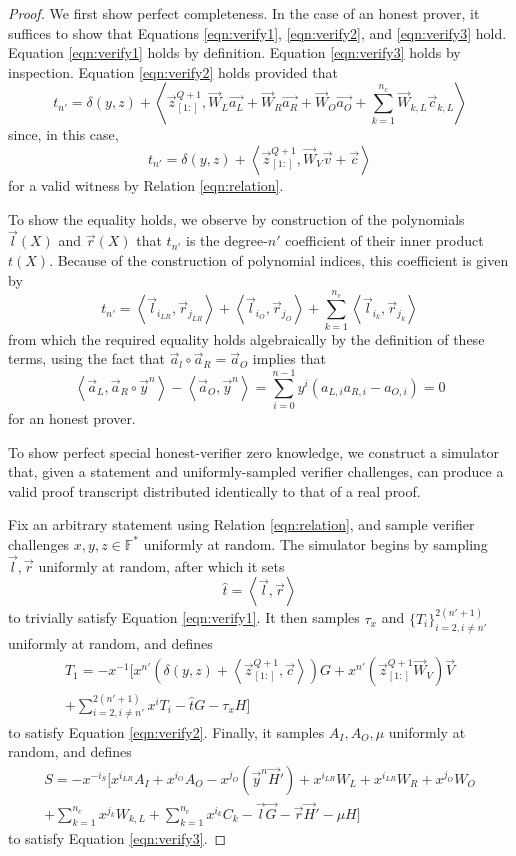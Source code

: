 \documentclass{article}
\newcommand{\FF}{\mathbb{F}}
\newcommand{\mat}[1]{\vec{#1}}
\newcommand{\zq}{\vec{z}^{Q+1}_{[1:]}}
\begin{document}
\begin{proof}
	We first show perfect completeness.
	In the case of an honest prover, it suffices to show that Equations \ref{eqn:verify1}, \ref{eqn:verify2}, and \ref{eqn:verify3} hold.
	Equation \ref{eqn:verify1} holds by definition.
	Equation \ref{eqn:verify3} holds by inspection.
	Equation \ref{eqn:verify2} holds provided that
	$$t_{n'} = \delta(y, z) + \left\langle \zq, \mat{W}_L \vec{a_L} + \mat{W}_R \vec{a_R} + \mat{W}_O \vec{a_O} + \sum_{k=1}^{n_c} \mat{W}_{k,L} \vec{c}_{k,L} \right\rangle$$
	since, in this case,
	$$t_{n'} = \delta(y, z) + \left\langle \zq, \mat{W}_V \vec{v} + \vec{c} \right\rangle$$
	for a valid witness by Relation \ref{eqn:relation}.

	To show the equality holds, we observe by construction of the polynomials $\vec{l}(X)$ and $\vec{r}(X)$ that $t_{n'}$ is the degree-$n'$ coefficient of their inner product $t(X)$.
	Because of the construction of polynomial indices, this coefficient is given by
	$$t_{n'} = \left\langle \vec{l}_{i_{LR}}, \vec{r}_{j_{LR}} \right\rangle
	+ \left\langle \vec{l}_{i_O}, \vec{r}_{j_O} \right\rangle
	+ \sum_{k=1}^{n_c} \left\langle \vec{l}_{i_k}, \vec{r}_{j_k} \right\rangle$$
	from which the required equality holds algebraically by the definition of these terms, using the fact that $\vec{a}_l \circ \vec{a}_R = \vec{a}_O$ implies that
	$$\left\langle \vec{a}_L, \vec{a}_R \circ \vec{y}^n \right\rangle - \left\langle \vec{a}_O, \vec{y}^n \right\rangle = \sum_{i=0}^{n-1} y^i \left( a_{L,i} a_{R,i} - a_{O,i} \right) = 0$$
	for an honest prover.

	To show perfect special honest-verifier zero knowledge, we construct a simulator that, given a statement and uniformly-sampled verifier challenges, can produce a valid proof transcript distributed identically to that of a real proof.

	Fix an arbitrary statement using Relation \ref{eqn:relation}, and sample verifier challenges $x, y, z \in \FF^*$ uniformly at random.
	The simulator begins by sampling $\vec{l}, \vec{r}$ uniformly at random, after which it sets $$\widehat{t} = \left\langle \vec{l}, \vec{r} \right\rangle$$ to trivially satisfy Equation \ref{eqn:verify1}.
	It then samples $\tau_x$ and $\{ T_i \}_{i=2, i \neq n'}^{2(n' + 1)}$ uniformly at random, and defines
	\begin{multline*}
	T_1 = -x^{-1} \Biggl[ x^{n'}\left( \delta(y, z) + \left\langle \zq, \vec{c} \right\rangle \right)G + x^{n'}\left( \zq \vec{W}_V \right) \vec{V} \\
	+ \sum_{i=2, i \neq n'}^{2(n' + 1)} x^i T_i - \widehat{t} G - \tau_x H \Biggr]
	\end{multline*}
	to satisfy Equation \ref{eqn:verify2}.
	Finally, it samples $A_I, A_O, \mu$ uniformly at random, and defines
	\begin{multline*}
		S = -x^{-i_S} \Biggl[ x^{i_{LR}} A_I + x^{i_O} A_O - x^{j_O} \left( \vec{y}^n \vec{H}' \right) + x^{i_{LR}} W_L + x^{i_{LR}} W_R + x^{j_O} W_O \\
		+ \sum_{k=1}^{n_c} x^{j_k} W_{k,L} + \sum_{k=1}^{n_c} x^{i_k} C_k - \vec{l} \vec{G} - \vec{r} \vec{H}' - \mu H \Biggr]
	\end{multline*}
	to satisfy Equation \ref{eqn:verify3}.


\end{proof}
\end{document}
